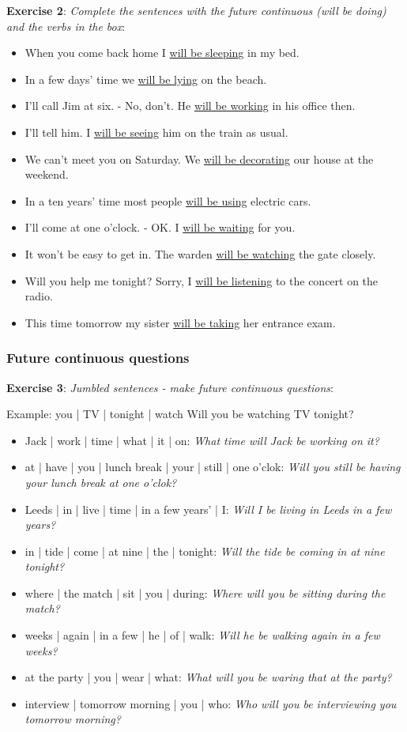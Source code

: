 \textbf{Exercise 2}: \textit{Complete the sentences with the future continuous (will be doing) and the verbs in the box}:

\begin{itemize}
\item When you come back home I \underline{will be sleeping} in my bed.
\item In a few days' time we \underline{will be lying} on the beach.
\item I'll call Jim at six. - No, don't. He \underline{will be working} in his office then.
\item I'll tell him. I \underline{will be seeing} him on the train as usual.
\item We can't meet you on Saturday. We \underline{will be decorating} our house at the weekend.
\item In a ten years' time most people \underline{will be using} electric cars.
\item I'll come at one o'clock. - OK. I \underline{will be waiting} for you.
\item It won't be easy to get in. The warden \underline{will be watching} the gate closely.
\item Will you help me tonight? Sorry, I \underline{will be listening} to the concert on the radio.
\item This time tomorrow my sister \underline{will be taking} her entrance exam.
\end{itemize}

\subsubsection{Future continuous questions}

\textbf{Exercise 3}: \textit{Jumbled sentences - make future continuous questions}:

Example:
you | TV | tonight | watch
Will you be watching TV tonight?

\begin{itemize}
\item Jack | work | time | what | it | on: \textit{What time will Jack be working on it?}
\item at | have | you | lunch break | your | still | one o'clok: \textit{Will you still be having your lunch break at one o'clok?}
\item Leeds | in | live | time | in a few years' | I: \textit{Will I be living in Leeds in a few years?}
\item in | tide | come | at nine | the | tonight: \textit{Will the tide be coming in at nine tonight?}
\item where | the match | sit | you | during: \textit{Where will you be sitting during the match?}
\item weeks | again | in a few | he | of | walk: \textit{Will he be walking again in a few weeks?}
\item at the party | you | wear | what: \textit{What will you be waring that at the party?}
\item interview | tomorrow morning | you | who: \textit{Who will you be interviewing you tomorrow morning?}

\end{itemize}

